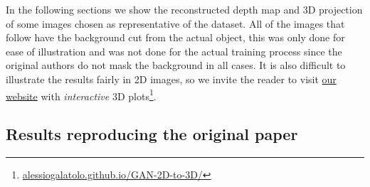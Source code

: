 In the following sections we show the reconstructed depth map and 3D projection of some images chosen as representative of the dataset. All of the images that follow have the background cut from the actual object, this was only done for ease of illustration and was not done for the actual training process since the original authors do not mask the background in all cases. It is also difficult to illustrate the results fairly in 2D images, so we invite the reader to visit \href{https://alessiogalatolo.github.io/GAN-2D-to-3D/}{our website} 
with \textit{interactive} 3D plots\footnote{\href{https://alessiogalatolo.github.io/GAN-2D-to-3D/}{alessiogalatolo.github.io/GAN-2D-to-3D/}}.

\subsection{Results reproducing the original paper}
\label{sec:replication}

